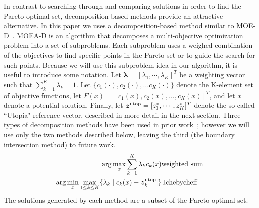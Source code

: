 \documentclass{article}
\begin{document}
In contrast to searching through and comparing solutions in order to find the Pareto optimal set, decomposition-based methods provide an attractive alternative.  
In this paper we uses a decomposition-based method similar to MOE-D~\cite{4358754}.  
MOEA-D is an algorithm that decomposes a multi-objective optimization problem into a set of subproblems.  
Each subproblem uses a weighed combination of the objectives to find specific points in the Pareto set or to guide the search for such points.  
Because we  will use this subproblem idea in our algorithm, it is useful to introduce some notation.
Let $ \bm{\lambda} = [ \lambda_{1} , \cdots , \lambda_{K}  ]^{T} $ be a weighting vector such that $ \sum_{k=1}^{K} \lambda_{k} = 1 $.  Let $\{c_{1}(\cdot), c_{2}(\cdot), \ldots c_{K}(\cdot)\}$ denote the K-element set of objective functions, let $F(x) = [c_{1}(x), c_{2}(x), \ldots, c_{K}(x)]^T$, and let $x$ denote a potential solution.  Finally, let $ \bm{z}^{\rm utop} = [z^{*}_{1}, \cdots , z^{*}_{K}]^{T} $ denote the so-called ``Utopia" reference vector, described in more detail in the next section. 
Three types of decomposition methods have been used in prior work~\cite{4358754}; however we will use only the two methods described below, leaving the third (the boundary intersection method) to future work.
\begin{eqnarray}
 \arg\max_x \sum_{k=1}^{K} \lambda_{k} c_{k} (x) & {\rm weighted \ sum} \label{eq:weighted}\\
 \arg\min_x\max_{1 \leq k \leq K}  \{ \lambda_{k} \mid c_{k}(x) - \bm{z}^{\rm utop}_{k}  | \} & {\rm Tchebycheff} \label{eq:Tchebycheff}%
\end{eqnarray}
The solutions generated by each method are a subset of the Pareto optimal set.
\end{document}
